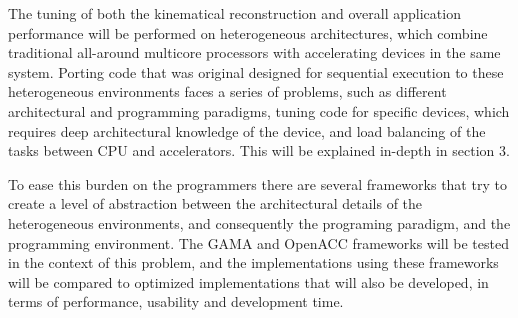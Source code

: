 The tuning of both the kinematical reconstruction and overall application performance will be performed on heterogeneous architectures, which combine traditional all-around multicore processors with accelerating devices in the same system. Porting code that was original designed for sequential execution to these heterogeneous environments faces a series of problems, such as different architectural and programming paradigms, tuning code for specific devices, which requires deep architectural knowledge of the device, and load balancing of the tasks between CPU and accelerators. This will be explained in-depth in section 3.

To ease this burden on the programmers there are several frameworks that try to create a level of abstraction between the architectural details of the heterogeneous environments, and consequently the programing paradigm, and the programming environment. The GAMA and OpenACC frameworks will be tested in the context of this problem, and the implementations using these frameworks will be compared to optimized implementations that will also be developed, in terms of performance, usability and development time.

\newpage
